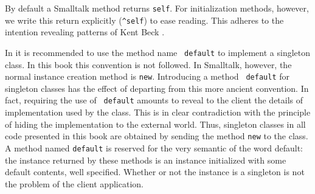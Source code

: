 \documentclass[twoside]{book}
\begin{document}
By default a Smalltalk method returns {\tt self}. For
initialization methods, however, we write this return explicitly
({\tt \^\/self}) to ease reading. This adheres to the intention
revealing patterns of Kent Beck \cite{Beck}.

In \cite{StDesPat} it is recommended to use the method name {\tt
default} to implement a singleton class. In this book this
convention is not followed. In Smalltalk, however, the normal
instance creation method is {\tt new}. Introducing a method {\tt
default} for singleton classes has the effect of departing from
this more ancient convention. In fact, requiring the use of {\tt
default} amounts to reveal to the client the details of
implementation used by the class. This is in clear contradiction
with the principle of hiding the implementation to the external
world.
Thus, singleton classes in all code presented in this book
are obtained by sending the method {\tt new} to the class.
A method named {\tt default} is reserved for the very semantic of
the word default: the instance returned by these methods is an
instance initialized with some default contents, well specified.
Whether or not the instance is a singleton is not the problem of
the client application.
\end{document}
